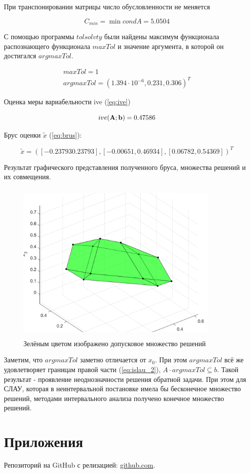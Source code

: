 \documentclass[12pt,a4paper]{scrartcl}
\begin{document}
При транспонировании матрицы число обусловленности не меняется

\begin{equation}
	C_{min} = \min{condA} = 5.0504
\end{equation}

С помощью программы $tolsolvty$ были найдены максимум функционала распознающего функционала $max Tol$ и значение аргумента, в которой он достигался $arg max Tol$.

\begin{equation}
	\begin{array}{c}
	maxTol = 1 \\
	argmaxTol = (1.394 \cdot 10^{-6}, 0.231, 0.306)^T
	\end{array}
\end{equation}

Оценка меры вариабельности ive (\ref{eq:ive})

\begin{equation}
	ive(\bold{A}; \bold{b}) = 0.47586
\end{equation}

Брус оценки $\tilde x$ (\ref{eq:brus}):

\begin{equation}
	\tilde x = ([-0.23793	0.23793], [-0.00651,	0.46934], [0.06782, 0.54369])^T
\end{equation}

Результат графического представления полученного бруса, множества решений и их совмещения.

\begin{figure}[H]
    \centering
    \includegraphics[width=10cm, height=8cm]{fig/ISLAU_2_3D.png}
    \caption{Зелёным цветом изображено допусковое множество решений}
\end{figure}

Заметим, что $argmaxTol$ заметно отличается от $x_0$. При этом $argmaxTol$ всё же удовлетворяет границам правой части (\ref{eq:islau_2}), $A\cdot argmaxTol \subseteq b$. Такой результат - проявление неоднозначности решения обратной задачи. При этом для СЛАУ, которая в неинтервальной постановке имела бы бесконечное множество решений, методами интервального анализа получено конечное множество решений.

\section{Приложения}
Репозиторий на GitHub с релизацией: \href{https://github.com/WiillyWonka/Intervals}{github.com}.
\end{document}
